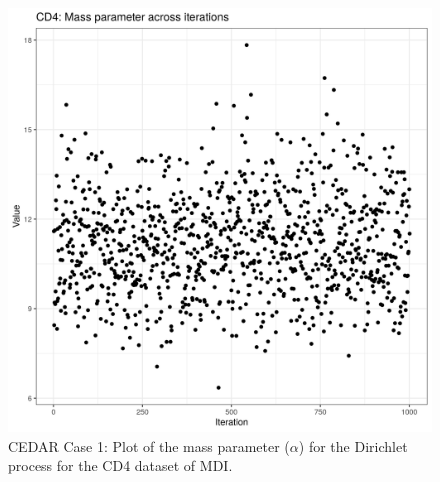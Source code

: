 \documentclass[14pt]{extarticle} %
\begin{document}
	\begin{figure}[h]
		\centering
		\includegraphics[scale=0.75]{Images/Biology_data/Set_250/All_datasets/Mass_parameter_plots/CD4.png}
		\caption{CEDAR Case 1: Plot of the mass parameter ($\alpha$) for the Dirichlet process for the CD4 dataset of MDI.}
		\label{fig:results:cedar_1:mdi_cd4_mass_parameter_plot}
	\end{figure}
	
	\newpage
	
\end{document}
